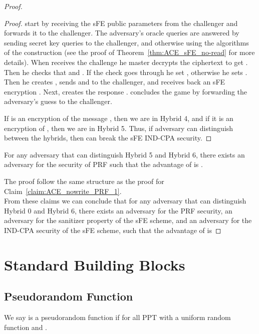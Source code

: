 \documentclass{llncs}
\begin{document}
\begin{proof}
\begin{proof}
 start by receiving the sFE public parameters from the challenger and forwards it to the challenger. The adversary's oracle queries are answered by sending secret key queries to the challenger, and otherwise using the algorithms of the construction (see the proof of Theorem~\ref{thm:ACE_sFE_no-read} for more details).
When  receives the challenge  he master decrypts the ciphertext to get . Then he checks that  and . If the check goes through he set , otherwise he sets .
Then he creates , sends  and  to the challenger, and receives back an sFE encryption . 
Next,  creates the response .
 concludes the game by forwarding the adversary's guess  to the challenger.


If  is an encryption of the message , then we are in Hybrid 4, and if it is an encryption of , then we are in Hybrid 5.
Thus, if adversary  can distinguish between the hybrids, then  can break the sFE IND-CPA security. 
\end{proof}

\begin{claim} \label{claim:ACE_nowrite_PRF_2}
For any adversary  that can distinguish Hybrid 5 and Hybrid 6, there exists an adversary  for the security of PRF  such that the advantage of  is 
. \\
\end{claim}

The proof follow the same structure as the proof for Claim~\ref{claim:ACE_nowrite_PRF_1}. \\

From these claims we can conclude that for any adversary  that can distinguish Hybrid 0 and Hybrid 6, there exists an adversary  for the PRF security, an adversary  for the sanitizer property of the sFE scheme, and an adversary  for the IND-CPA security of the sFE scheme, such that the advantage of  is

\end{proof}





\newpage


\appendix

\clearpage

\section{Standard Building Blocks}\label{app:bb}

\subsection{Pseudorandom Function}
\begin{defi}[PRF]
We say  is a pseudorandom function if for all PPT  
 with  a uniform random function and .  \end{defi}
\end{document}
